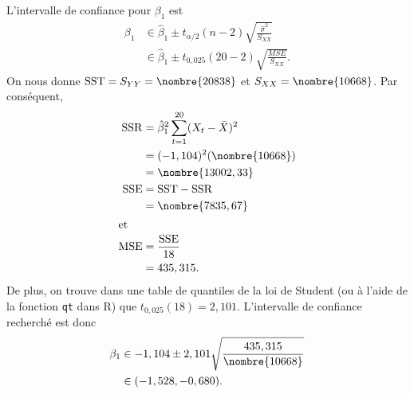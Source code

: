 \begin{solution}{2.12}
    L'intervalle de confiance pour $\beta_1$ est
    \begin{align*}
      \beta_1
      &\in \hat{\beta}_1 \pm t_{\alpha/2}(n - 2)
      \sqrt{\frac{\hat{\sigma}^2}{S_{XX}}} \\
      &\in \hat{\beta}_1 \pm t_{0,025}(20 - 2) \sqrt{\frac{MSE}{S_{XX}}}.
     \end{align*}
     On nous donne $\SST = S_{YY} = \nombre{20838}$ et $S_{XX} =
     \nombre{10668}$. Par conséquent,
     \begin{align*}
       \SSR
       &= \hat{\beta}_1^2 \sum_{t=1}^{20} (X_t - \bar{X})^2 \\
       &= (-1,104)^2(\nombre{10668}) \\
       &= \nombre{13002,33} \\
       \SSE
       &= \SST - \SSR \\
       &= \nombre{7835,67} \\
       \intertext{et}
       \MSE
       &= \frac{\SSE}{18} \\
       &= 435,315.
     \end{align*}
     De plus, on trouve dans une table de quantiles de la loi de
     Student (ou à l'aide de la fonction \texttt{qt} dans \textsf{R})
     que $t_{0,025}(18) = 2,101$. L'intervalle de confiance recherché
     est donc
     \begin{align*}
       \beta_1
       &\in -1,104 \pm 2,101 \sqrt{\frac{435,315}{\nombre{10668}}} \\
       &\in (-1,528, -0,680).
     \end{align*}
  
\end{solution}
